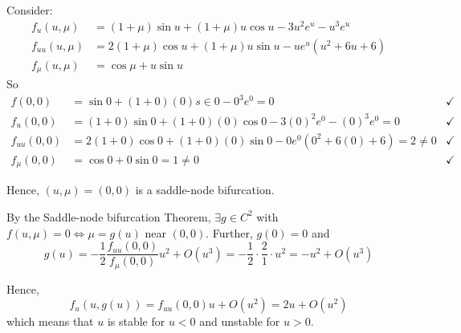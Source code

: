 \documentclass[12pt]{article}
\begin{document}
Consider:
\begin{align*}
    f_u(u, \mu)     & = (1 + \mu) \sin u + (1 + \mu)u \cos u - 3u^2 e^u - u^3 e^u  \\
    f_{uu}(u, \mu)  & = 2(1 + \mu) \cos u + (1 + \mu)u \sin u - ue^u(u^2 + 6u + 6) \\
    f_{\mu}(u, \mu) & = \cos \mu + u \sin u
\end{align*}
So
\begin{align*}
    f(0, 0)       & = \sin 0 + (1 + 0)(0)s\in 0 - 0^3 e^0 = 0                             & \checkmark \\
    f_u(0, 0)     & = (1 + 0)\sin 0 + (1 + 0)(0)\cos 0 - 3(0)^2 e^0 - (0)^3 e^0 = 0       & \checkmark \\
    f_{uu}(0, 0)  & = 2(1 + 0)\cos 0 + (1 + 0)(0)\sin 0 - 0e^0(0^2 + 6(0) + 6) = 2 \neq 0 & \checkmark \\
    f_{\mu}(0, 0) & = \cos 0 + 0\sin 0 = 1 \neq 0                                         & \checkmark
\end{align*}

Hence, $(u, \mu) = (0, 0)$ is a saddle-node bifurcation.

By the Saddle-node bifurcation Theorem, $\exists g \in C^2$ with $f(u, \mu) = 0 \iff \mu = g(u)$ near $(0, 0)$. Further, $g(0) = 0$ and
\[g(u) = -\frac{1}{2} \frac{f_{uu}(0, 0)}{f_{\mu}(0, 0)}u^2 + O(u^3) = -\frac{1}{2} \cdot \frac{2}{1} \cdot u^2 = -u^2 + O(u^3)\]

Hence,
\[f_u(u, g(u)) = f_{uu}(0, 0)u + O(u^2) = 2u + O(u^2)\]
which means that $u$ is stable for $u < 0$ and unstable for $u > 0$.
\end{document}
